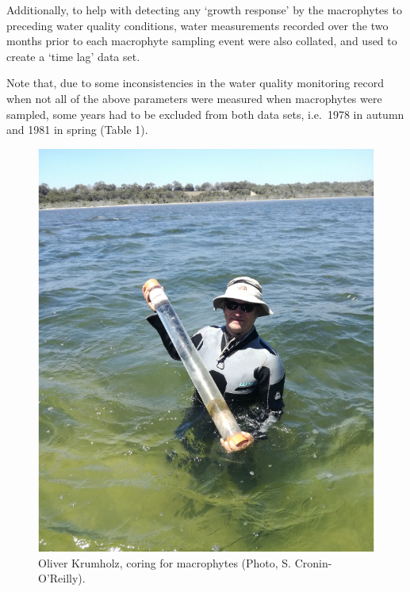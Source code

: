 \documentclass[
]{book}
\begin{document}
Additionally, to help with detecting any `growth response' by the macrophytes to preceding water quality conditions, water measurements recorded over the two months prior to each macrophyte sampling event were also collated, and used to create a `time lag' data set.

Note that, due to some inconsistencies in the water quality monitoring record when not all of the above parameters were measured when macrophytes were sampled, some years had to be excluded from both data sets, i.e.~1978 in autumn and 1981 in spring (Table 1).

\begin{figure}
\includegraphics[width=0.75\linewidth]{images/macrophytes/picture3} \caption{Oliver Krumholz, coring for macrophytes (Photo, S. Cronin-O’Reilly).}\label{fig:macrophytes-pic3}
\end{figure}
\end{document}
